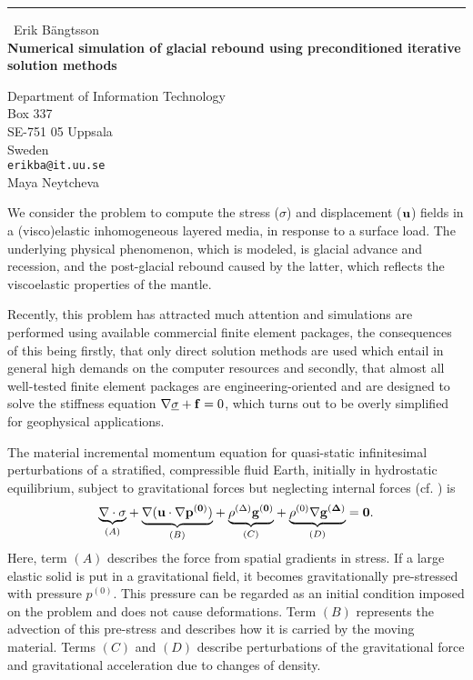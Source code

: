 \documentclass{report}
\begin{document}
\begin{center}
\rule{6in}{1pt} \
{\large Erik B{\"a}ngtsson \\
{\bf Numerical simulation of glacial rebound using preconditioned iterative solution methods}}

Department of Information Technology \\ Box 337 \\ SE-751 05 Uppsala \\ Sweden
\\
{\tt erikba@it.uu.se}\\
Maya Neytcheva\end{center}

We consider the problem to compute the stress ($\sigma$) and
displacement ($\bf{u}$) fields in a (visco)elastic inhomogeneous layered
media, in response to a surface load. The underlying physical phenomenon,
which is modeled, is glacial advance and recession, and the post-glacial
rebound caused by the latter, which reflects the viscoelastic properties
of the mantle.

Recently, this problem has attracted much attention and simulations
are performed using available commercial finite element packages, the
consequences of this being firstly, that only direct solution methods
are used which entail in general high demands on the computer
resources and secondly, that almost all well-tested finite element packages
are engineering-oriented and are designed to solve the stiffness
equation $\nabla\underline{\sigma} + {\bf f} = 0$, which turns out to be
overly simplified for
geophysical applications.

The material incremental momentum equation for quasi-static infinitesimal
perturbations of a stratified, compressible fluid Earth, initially in
hydrostatic equilibrium, subject to gravitational forces but neglecting
internal forces (cf. \cite{KlemannWuWolf}) is
$$
\underset{(A)}{\underbrace{\nabla\cdot\sigma}} +
\underset{(B)}{\underbrace{\nabla(\bf{u}\cdot\nabla p^{(0)})}} +
\underset{(C)}{\underbrace{\rho^{(\Delta)}\bf{g}^{(0)}}} +
\underset{(D)}{\underbrace{\rho^{(0)}\nabla\bf{g}^{(\Delta)}}} = \bf{0}.
$$
Here, term $(A)$ describes the force from spatial gradients in stress. If
a large elastic solid is put in a gravitational field, it becomes
gravitationally pre-stressed with pressure $p^{(0)}$. This pressure can
be regarded as an initial condition imposed on the problem and does not
cause deformations. Term $(B)$ represents the advection of this
pre-stress and describes how it is carried by the moving
material. Terms $(C)$ and $(D)$ describe perturbations of the
gravitational force and gravitational acceleration due to changes of
density.
\end{document}

